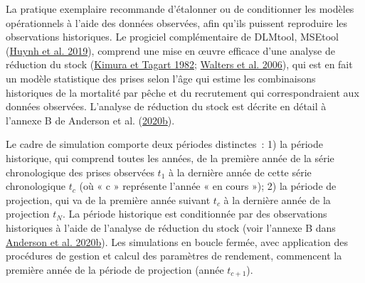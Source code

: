 \documentclass[french,11pt]{book}
\begin{document}
La pratique exemplaire recommande d'étalonner ou de conditionner les modèles opérationnels à l'aide des données observées, afin qu'ils puissent reproduire les observations historiques. Le progiciel complémentaire de DLMtool, MSEtool (\protect\hyperlink{ref-huynh_msetool_2019}{Huynh et al. 2019}), comprend une mise en œuvre efficace d'une analyse de réduction du stock (\protect\hyperlink{ref-kimura1982}{Kimura et Tagart 1982}; \protect\hyperlink{ref-walters2006}{Walters et al. 2006}), qui est en fait un modèle statistique des prises selon l'âge qui estime les combinaisons historiques de la mortalité par pêche et du recrutement qui correspondraient aux données observées. L'analyse de réduction du stock est décrite en détail à l'annexe B de Anderson et al. (\protect\hyperlink{ref-anderson2020gfmp}{2020b}).

Le cadre de simulation comporte deux périodes distinctes~: 1) la période historique, qui comprend toutes les années, de la première année de la série chronologique des prises observées \(t_1\) à la dernière année de cette série chronologique \(t_c\) (où « c » représente l'année « en cours »); 2) la période de projection, qui va de la première année suivant \(t_c\) à la dernière année de la projection \(t_N\). La période historique est conditionnée par des observations historiques à l'aide de l'analyse de réduction du stock (voir l'annexe B dans \protect\hyperlink{ref-anderson2020gfmp}{Anderson et al. 2020b}). Les simulations en boucle fermée, avec application des procédures de gestion et calcul des paramètres de rendement, commencent la première année de la période de projection (année \(t_{c+1}\)).
\end{document}
